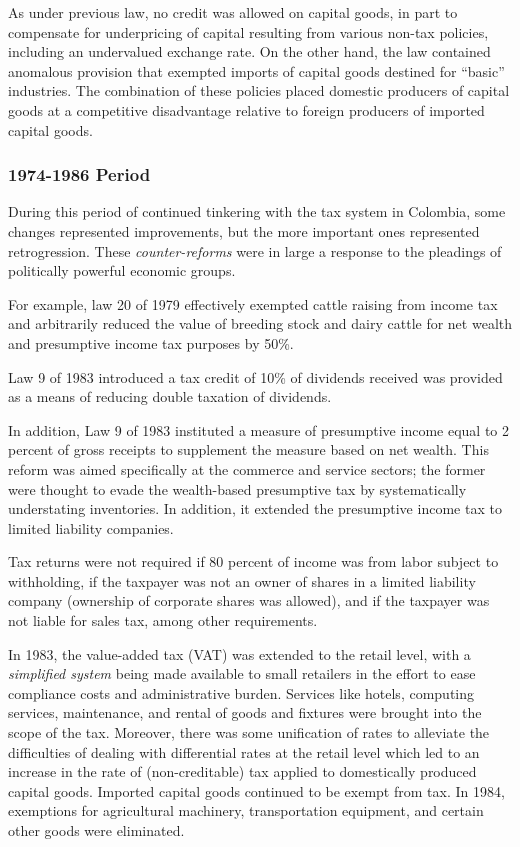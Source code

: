 \documentclass[
  12pt]{article}
\theoremstyle{definition}
\theoremstyle{remark}
\begin{document}
As under previous law, no credit was allowed on capital goods, in part
to compensate for underpricing of capital resulting from various non-tax
policies, including an undervalued exchange rate. On the other hand, the
law contained anomalous provision that exempted imports of capital goods
destined for ``basic'' industries. The combination of these policies
placed domestic producers of capital goods at a competitive disadvantage
relative to foreign producers of imported capital goods.

\subsubsection{1974-1986 Period}\label{period}

During this period of continued tinkering with the tax system in
Colombia, some changes represented improvements, but the more important
ones represented retrogression. These \emph{counter-reforms} were in
large a response to the pleadings of politically powerful economic
groups.

For example, law 20 of 1979 effectively exempted cattle raising from
income tax and arbitrarily reduced the value of breeding stock and dairy
cattle for net wealth and presumptive income tax purposes by 50\%.

Law 9 of 1983 introduced a tax credit of 10\% of dividends received was
provided as a means of reducing double taxation of dividends.

In addition, Law 9 of 1983 instituted a measure of presumptive income
equal to 2 percent of gross receipts to supplement the measure based on
net wealth. This reform was aimed specifically at the commerce and
service sectors; the former were thought to evade the wealth-based
presumptive tax by systematically understating inventories. In addition,
it extended the presumptive income tax to limited liability companies.

Tax returns were not required if 80 percent of income was from labor
subject to withholding, if the taxpayer was not an owner of shares in a
limited liability company (ownership of corporate shares was allowed),
and if the taxpayer was not liable for sales tax, among other
requirements.

In 1983, the value-added tax (VAT) was extended to the retail level,
with a \emph{simplified system} being made available to small retailers
in the effort to ease compliance costs and administrative burden.
Services like hotels, computing services, maintenance, and rental of
goods and fixtures were brought into the scope of the tax. Moreover,
there was some unification of rates to alleviate the difficulties of
dealing with differential rates at the retail level which led to an
increase in the rate of (non-creditable) tax applied to domestically
produced capital goods. Imported capital goods continued to be exempt
from tax. In 1984, exemptions for agricultural machinery, transportation
equipment, and certain other goods were eliminated.
\end{document}
